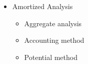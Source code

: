 \begin{itemize}
  \item Amortized Analysis
  \begin{itemize}
    \item Aggregate analysis
    \item Accounting method
    \item Potential method
  \end{itemize}
\end{itemize}
